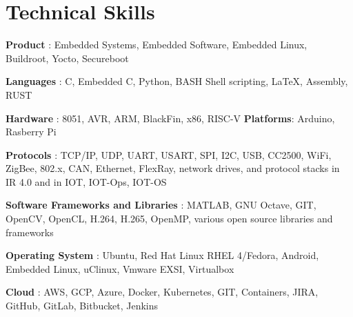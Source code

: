 \documentclass[letterpaper,11pt]{article}
\newcommand{\resumeItemListEnd}{\end{itemize}\vspace{-5pt}}
\begin{document}
            
            
\section{Technical Skills}
    \begin{itemize}[leftmargin=0.15in, label={}]
    \small{
    \item {\textbf{Product}
    {: Embedded Systems, Embedded Software, Embedded Linux, Buildroot, Yocto, Secureboot}}
    }
    \item {\textbf{Languages}
    {: C, Embedded C, Python, BASH Shell scripting, \LaTeX, Assembly, RUST}}
    \item  \textbf{Hardware}
    {: 8051, AVR, ARM, BlackFin, x86, RISC-V \textbf{Platforms}: Arduino, Rasberry Pi}
    \item  \textbf{Protocols}
    {: TCP/IP, UDP, UART, USART, SPI, I2C, USB, CC2500, WiFi, ZigBee, 802.x, CAN, Ethernet, FlexRay, network drives, and protocol stacks in IR 4.0 and in IOT, IOT-Ops, IOT-OS}
    \item  \textbf{Software Frameworks and Libraries}
    {: MATLAB, GNU Octave, GIT, OpenCV, OpenCL, H.264, H.265, OpenMP, various open source libraries and frameworks}
    \item  \textbf{Operating System}
    {: Ubuntu, Red Hat Linux RHEL 4/Fedora, Android, Embedded Linux, uClinux, Vmware EXSI, Virtualbox}
    \item  \textbf{Cloud}
    {: AWS, GCP, Azure, Docker, Kubernetes, GIT, Containers, JIRA, GitHub, GitLab, Bitbucket, Jenkins}
    
 \end{itemize}
\end{document}
